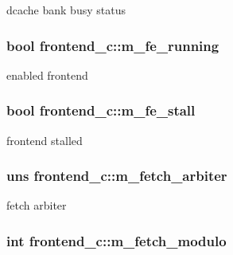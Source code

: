 \label{classfrontend__c_a122be13c09b552fb5fd8fdfda289c9f2}
dcache bank busy status \hypertarget{classfrontend__c_ad209b62e2a8616d2fe15edfa54b2b513}{
\subsubsection[{m\_\-fe\_\-running}]{\setlength{\rightskip}{0pt plus 5cm}bool {\bf frontend\_\-c::m\_\-fe\_\-running}}}
\label{classfrontend__c_ad209b62e2a8616d2fe15edfa54b2b513}
enabled frontend \hypertarget{classfrontend__c_a3ddc92b5614174fd7d77f4f0e7db5538}{
\subsubsection[{m\_\-fe\_\-stall}]{\setlength{\rightskip}{0pt plus 5cm}bool {\bf frontend\_\-c::m\_\-fe\_\-stall}}}
\label{classfrontend__c_a3ddc92b5614174fd7d77f4f0e7db5538}
frontend stalled \hypertarget{classfrontend__c_af1f0bce8b49a7903883ead8cba0a3963}{
\subsubsection[{m\_\-fetch\_\-arbiter}]{\setlength{\rightskip}{0pt plus 5cm}uns {\bf frontend\_\-c::m\_\-fetch\_\-arbiter}}}
\label{classfrontend__c_af1f0bce8b49a7903883ead8cba0a3963}
fetch arbiter \hypertarget{classfrontend__c_abc56bb3ebfa3d76413b83c6174079c3c}{
\subsubsection[{m\_\-fetch\_\-modulo}]{\setlength{\rightskip}{0pt plus 5cm}int {\bf frontend\_\-c::m\_\-fetch\_\-modulo}}}
